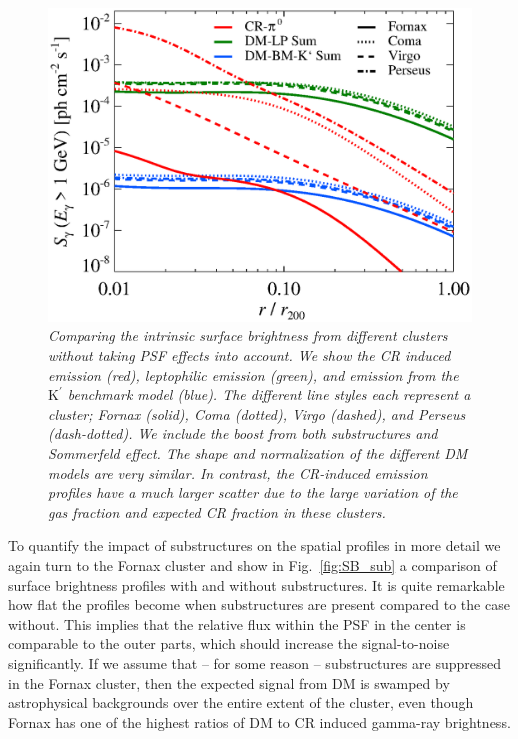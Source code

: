 \documentclass[10pt,aps,pra,reprint,amsmath,amsfonts,amssymb,showpacs,nofootinbib,floatfix]{revtex4-1}
\newcommand{\rmn}{\mathrm}
\newcommand{\Kp}{\rmn{K}^\prime}
\begin{document}
\begin{figure}
 \includegraphics[width=0.99\columnwidth]{figures/SB.v14.1GeV.SF700.SubMass.elmu.eps}
 \caption{\it Comparing the intrinsic surface brightness from
   different clusters without taking PSF effects into account. We show
   the CR induced emission (red), leptophilic emission (green), and
   emission from the $\Kp$ benchmark model (blue). The different line
   styles each represent a cluster; Fornax (solid), Coma (dotted),
   Virgo (dashed), and Perseus (dash-dotted). We include the boost
   from both substructures and Sommerfeld effect. The shape and
   normalization of the different DM models are very similar. In
   contrast, the CR-induced emission profiles have a much larger
   scatter due to the large variation of the gas fraction and expected
   CR fraction in these clusters.}
 \label{fig:SB_clu}
\end{figure}

To quantify the impact of substructures on the spatial profiles in
more detail we again turn to the Fornax cluster and show in
Fig.~\ref{fig:SB_sub} a comparison of surface brightness profiles with
and without substructures. It is quite remarkable how flat the
profiles become when substructures are present compared to the case
without. This implies that the relative flux within the PSF in the
center is comparable to the outer parts, which should increase the
signal-to-noise significantly. If we assume that -- for
some reason -- substructures are suppressed in the Fornax cluster, then the expected
signal from DM is swamped by astrophysical backgrounds over the entire
extent of the cluster, even though Fornax has one of the highest
ratios of DM to CR induced gamma-ray brightness.
\end{document}
